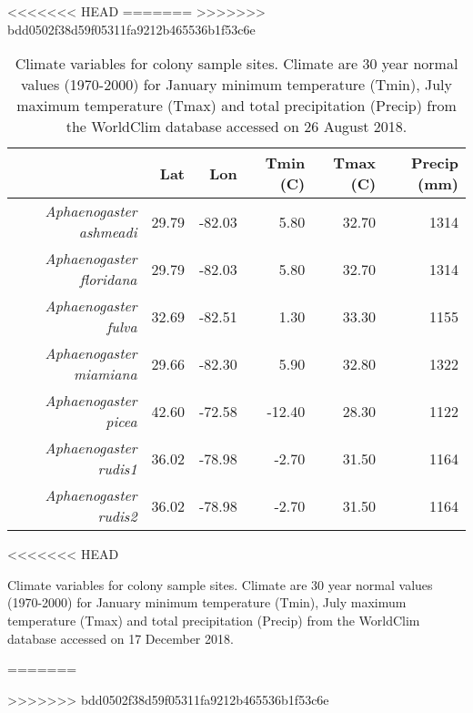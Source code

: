 <<<<<<< HEAD
=======
>>>>>>> bdd0502f38d59f05311fa9212b465536b1f53c6e
\begin{table}[ht]
\centering
\begin{tabular}{rrrrrr}
  \hline
 & Lat & Lon & Tmin (C) & Tmax (C) & Precip (mm) \\ 
  \hline
{\emph{Aphaenogaster ashmeadi}} & 29.79 & -82.03 & 5.80 & 32.70 & 1314 \\ 
  {\emph{Aphaenogaster floridana}} & 29.79 & -82.03 & 5.80 & 32.70 & 1314 \\ 
  {\emph{Aphaenogaster fulva}} & 32.69 & -82.51 & 1.30 & 33.30 & 1155 \\ 
  {\emph{Aphaenogaster miamiana}} & 29.66 & -82.30 & 5.90 & 32.80 & 1322 \\ 
  {\emph{Aphaenogaster picea}} & 42.60 & -72.58 & -12.40 & 28.30 & 1122 \\ 
  {\emph{Aphaenogaster rudis1}} & 36.02 & -78.98 & -2.70 & 31.50 & 1164 \\ 
  {\emph{Aphaenogaster rudis2}} & 36.02 & -78.98 & -2.70 & 31.50 & 1164 \\ 
   \hline
\end{tabular}
<<<<<<< HEAD
\caption{Climate variables for colony sample sites. Climate are 30 year normal values (1970-2000) for January minimum temperature (Tmin), July maximum temperature (Tmax) and total precipitation (Precip) from the WorldClim database accessed on 17 December 2018.} 
=======
\caption{Climate variables for colony sample sites. Climate are 30 year normal values (1970-2000) for January minimum temperature (Tmin), July maximum temperature (Tmax) and total precipitation (Precip) from the WorldClim database accessed on 26 August 2018.} 
>>>>>>> bdd0502f38d59f05311fa9212b465536b1f53c6e
\label{tab:climate}
\end{table}
